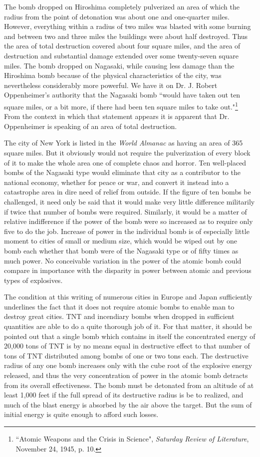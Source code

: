 The bomb dropped on Hiroshima completely pulverized an area of which the radius from the point of detonation was about one and one-quarter miles. However, everything within a radius of two miles was blasted with some burning and between two and three miles the buildings were about half destroyed. Thus the area of total destruction covered about four square miles, and the area of destruction and substantial damage extended over some twenty-seven square miles. The bomb dropped on Nagasaki, while causing less damage than the Hiroshima bomb because of the physical characteristics of the city, was nevertheless considerably more powerful. We have it on Dr. J. Robert Oppenheimer's authority that the Nagasaki bomb ``would have taken out ten square miles, or a bit more, if there had been ten square miles to take out."\footnote{``Atomic Weapons and the Crisis in Science", \textit{Saturday Review of Literature}, November 24, 1945, p. 10.} From the context in which that statement appears it is apparent that Dr. Oppenheimer is speaking of an area of total destruction.

The city of New York is listed in the \emph{World Almanac} as having an area of 365 square miles. But it obviously would not require the pulverization of every block of it to make the whole area one of complete chaos and horror. Ten well-placed bombs of the Nagasaki type would eliminate that city as a contributor to the national economy, whether for peace or war, and convert it instead into a catastrophe area in dire need of relief from outside. If the figure of ten bombs be challenged, it need only be said that it would make very little difference militarily if twice that number of bombs were required. Similarly, it would be a matter of relative indifference if the power of the bomb were so increased as to require only five to do the job. Increase of power in the individual bomb is of especially little moment to cities of small or medium size, which would be wiped out by one bomb each whether that bomb were of the Nagasaki type or of fifty times as much power. No conceivable variation in the power of the atomic bomb could compare in importance with the disparity in power between atomic and previous types of explosives.

The condition at this writing of numerous cities in Europe and Japan sufficiently underlines the fact that it does not require atomic bombs to enable man to destroy great cities. TNT and incendiary bombs when dropped in sufficient quantities are able to do a quite thorough job of it. For that matter, it should be pointed out that a single bomb which contains in itself the concentrated energy of 20,000 tons of TNT is by no means equal in destructive effect to that number of tons of TNT distributed among bombs of one or two tons each. The destructive radius of any one bomb increases only with the cube root of the explosive energy released, and thus the very concentration of power in the atomic bomb detracts from its overall effectiveness. The bomb must be detonated from an altitude of at least 1,000 feet if the full spread of its destructive radius is be to realized, and much of the blast energy is absorbed by the air above the target. But the sum of initial energy is quite enough to afford such losses.


